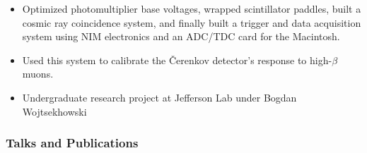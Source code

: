 \documentclass[12pt]{article}
\begin{document}
\begin{itemize}
\begin{itemize}

  \item Optimized photomultiplier base voltages, wrapped scintillator
    paddles, built a cosmic ray coincidence system, and finally built
    a trigger and data acquisition system using NIM electronics and an
    ADC/TDC card for the Macintosh.

  \item Used this system to calibrate the \v Cerenkov detector's
    response to high-$\beta$ muons.

  \item Undergraduate research project at Jefferson Lab under
    Bogdan Wojtsekhowski

\end{itemize}


\end{itemize}

\subsubsection*{Talks and Publications}
\end{document}
